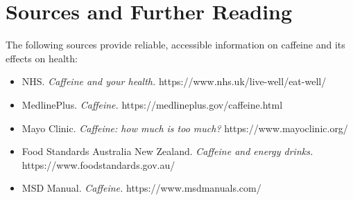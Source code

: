 \section*{Sources and Further Reading}
The following sources provide reliable, accessible information on caffeine and its effects on health:
\begin{itemize}
    \item NHS. \textit{Caffeine and your health.} https://www.nhs.uk/live-well/eat-well/
    \item MedlinePlus. \textit{Caffeine.} https://medlineplus.gov/caffeine.html
    \item Mayo Clinic. \textit{Caffeine: how much is too much?} https://www.mayoclinic.org/
    \item Food Standards Australia New Zealand. \textit{Caffeine and energy drinks.} https://www.foodstandards.gov.au/
    \item MSD Manual. \textit{Caffeine.} https://www.msdmanuals.com/
\end{itemize}

